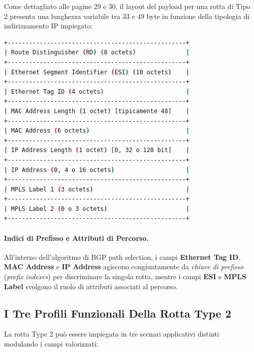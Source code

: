 \documentclass[11pt, a4paper]{article}
\begin{document}
Come dettagliato alle pagine 29 e 30, il layout del payload per una rotta di Tipo 2 presenta una lunghezza variabile tra $33$ e $49$ byte in funzione della tipologia di indirizzamento IP impiegato:

\begin{lstlisting}[language=bash]
+--------------------------------------------------+
| Route Distinguisher (RD) (8 octets)              |
+--------------------------------------------------+
| Ethernet Segment Identifier (ESI) (10 octets)    |
+--------------------------------------------------+
| Ethernet Tag ID (4 octets)                       |
+--------------------------------------------------+
| MAC Address Length (1 octet) [tipicamente 48]    |
+--------------------------------------------------+
| MAC Address (6 octets)                           |
+--------------------------------------------------+
| IP Address Length (1 octet) [0, 32 o 128 bit]    |
+--------------------------------------------------+
| IP Address (0, 4 o 16 octets)                    |
+--------------------------------------------------+
| MPLS Label 1 (3 octets)                          |
+--------------------------------------------------+
| MPLS Label 2 (0 o 3 octets)                      |
+--------------------------------------------------+
\end{lstlisting}

\paragraph{Indici di Prefisso e Attributi di Percorso.}
All'interno dell'algoritmo di BGP path selection, i campi \textbf{Ethernet Tag ID}, \textbf{MAC Address} e \textbf{IP Address} agiscono congiuntamente da \emph{chiave di prefisso} (\emph{prefix indexes}) per discriminare la singola rotta, mentre i campi \textbf{ESI} e \textbf{MPLS Label} svolgono il ruolo di attributi associati al percorso.

\subsection{I Tre Profili Funzionali Della Rotta Type 2}

La rotta Type 2 può essere impiegata in tre scenari applicativi distinti modulando i campi valorizzati:
\end{document}
